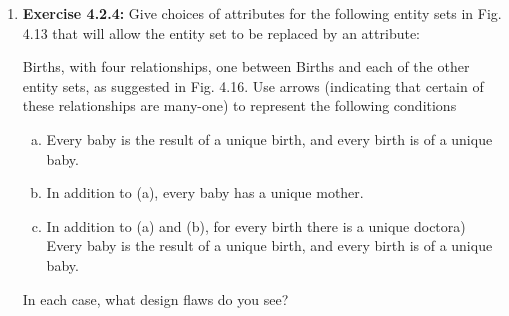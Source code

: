 \documentclass[12pt]{article}
\begin{document}
\begin{enumerate}[1.]
    \item \textbf{Exercise 4.2.4:} Give choices of attributes for the following entity sets in
    Fig. 4.13 that will allow the entity set to be replaced by an attribute:

    \bigskip

    Births, with four relationships, one between Births and each of the other entity
    sets, as suggested in Fig. 4.16. Use arrows (indicating that certain of these
    relationships are many-one) to represent the following conditions

    \bigskip

    \begin{enumerate}[a)]
        \item Every baby is the result of a unique birth, and every birth is of a unique baby.
        \item In addition to (a), every baby has a unique mother.
        \item In addition to (a) and (b), for every birth there is a unique doctora) Every baby is the result of a unique birth, and every birth is of a unique baby.
    \end{enumerate}

    \bigskip

    In each case, what design flaws do you see?

\end{enumerate}
\end{document}
